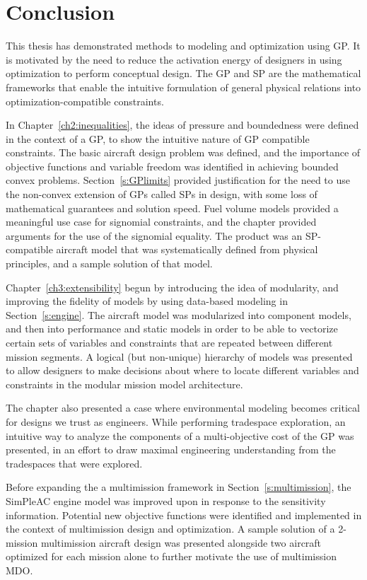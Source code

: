\chapter{Conclusion}
\label{ch5:conclusion}

This thesis has demonstrated methods to modeling and optimization using \gls{GP}. It
is motivated by the need to reduce the activation energy of designers in using
optimization to perform conceptual design. The \gls{GP} and \gls{SP} are the
mathematical frameworks that enable the intuitive formulation of general
physical relations into optimization-compatible constraints.

In Chapter~\ref{ch2:inequalities}, the ideas of pressure and boundedness were
defined in the context of a \gls{GP}, to show the intuitive nature of \gls{GP}
compatible constraints. The basic aircraft design problem was defined,
and the importance of objective functions and variable freedom
was identified in achieving bounded convex problems.
Section~\ref{s:GPlimits} provided justification for the need to use the non-convex
extension of \gls{GP}s called \gls{SP}s in design, with some loss of mathematical
guarantees and solution speed. Fuel volume models provided a meaningful use
case for signomial constraints, and the chapter provided arguments for the use of the signomial
equality. The product was an \gls{SP}-compatible aircraft model that was systematically defined from
physical principles, and a sample solution of that model.

Chapter~\ref{ch3:extensibility} begun by introducing the idea of modularity, and improving
the fidelity of models by using data-based modeling in Section~\ref{s:engine}.
The aircraft model was modularized
into component models, and then into performance and static models in order to
be able to vectorize certain sets of variables and constraints that are repeated between
different mission segments. A logical (but non-unique) hierarchy of models
was presented to allow designers to make decisions about where to locate different variables
and constraints in the modular mission model architecture.

The chapter also presented a case where environmental modeling becomes critical
for designs we trust as engineers. While performing tradespace exploration, an intuitive
way to analyze the components of a multi-objective cost of the \gls{GP} was presented, in
an effort to draw maximal engineering understanding from the tradespaces that were explored.

Before expanding the a multimission framework in Section~\ref{s:multimission},
the SimPleAC engine model was improved upon
in response to the sensitivity information. Potential
new objective functions were identified and implemented in the context of multimission design
and optimization.
A sample solution of a 2-mission multimission aircraft design
was presented alongside two aircraft optimized for each mission alone to further motivate
the use of multimission \gls{MDO}.

